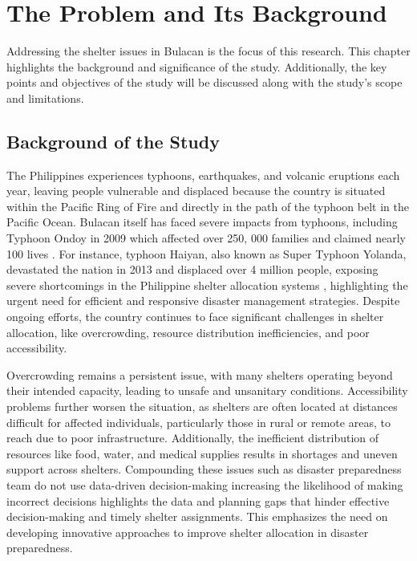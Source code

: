 \chapter{The Problem and Its Background}

	Addressing the shelter issues in Bulacan is the focus of this research. This chapter highlights the background and significance of the study. Additionally, the key points and objectives of the study will be discussed along with the study's scope and limitations.

\section{Background of the Study}

	The Philippines experiences typhoons, earthquakes, and volcanic eruptions each year, leaving people vulnerable and displaced because the country is situated within the Pacific Ring of Fire and directly in the path of the typhoon belt in the Pacific Ocean. Bulacan itself has faced severe impacts from typhoons, including Typhoon Ondoy in 2009 which affected over 250, 000 families and claimed nearly 100 lives  \parencite{James2009}. For instance, typhoon Haiyan, also known as Super Typhoon Yolanda, devastated the nation in 2013 and displaced over 4 million people, exposing severe shortcomings in the Philippine shelter allocation systems \parencite{Iuchi2019}, highlighting the urgent need for efficient and responsive disaster management strategies. Despite ongoing efforts, the country continues to face significant challenges in shelter allocation, like overcrowding, resource distribution inefficiencies, and poor accessibility.
	
	Overcrowding remains a persistent issue, with many shelters operating beyond their intended capacity, leading to unsafe and unsanitary conditions. Accessibility problems further worsen the situation, as shelters are often located at distances difficult for affected individuals, particularly those in rural or remote areas, to reach due to poor infrastructure.	Additionally, the inefficient distribution of resources like food, water, and medical supplies results in shortages and uneven support across shelters. Compounding these issues such as disaster preparedness team do not use data-driven decision-making increasing the likelihood of making incorrect decisions highlights the data and planning gaps that hinder effective decision-making and timely shelter assignments. This emphasizes the need on developing innovative approaches to improve shelter allocation in disaster preparedness. 
	
